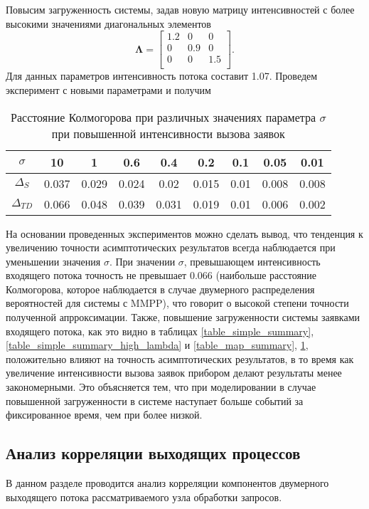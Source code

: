 Повысим загруженность системы, задав новую матрицу интенсивностей с более высокими значениями диагональных элементов 
 \begin{equation*}
	\boldsymbol{\Lambda}=\begin{bmatrix}
		1.2 &	0 & 0\\
		0 &	0.9 & 0\\
		0 &	0 & 1.5\\
	\end{bmatrix}.
\end{equation*}
Для данных параметров интенсивность потока составит 1.07. Проведем эксперимент с новыми параметрами и получим
\clearpage
\begin{table}[htb!] 
	\centering
	\caption{Расстояние Колмогорова при различных значениях параметра $\sigma$ при повышенной интенсивности вызова заявок}
	\label{table_map_summary_high_lambda}
	\begin{tabular}{| c | c | c | c | c | c | c | c | c |}
		\hline
		$\sigma$ & 10 & 1 & 0.6 & 0.4 & 0.2 & 0.1 & 0.05 & 0.01 \\ 
		\hline
		$\Delta_S$ & 0.037 & 0.029 & 0.024 & 0.02 & 0.015 & 0.01 & 0.008 & 0.008\\
		\hline
		$\Delta_{TD}$ & 0.066 & 0.048 & 0.039 & 0.031 & 0.019 & 0.01 & 0.006 & 0.002\\
		\hline
	\end{tabular}
\end{table}

На основании проведенных экспериментов можно сделать вывод, что тенденция к увеличению точности асимптотических результатов всегда наблюдается при уменьшении значения $\sigma$. При  значении $\sigma$, превышающем интенсивность входящего потока точность не превышает 0.066 (наибольше расстояние Колмогорова, которое наблюдается в случае двумерного распределения вероятностей для системы с MMPP), что говорит о высокой степени точности полученной апрроксимации. Также, повышение загруженности системы заявками входящего потока, как это видно в таблицах \ref{table_simple_summary}, \ref{table_simple_summary_high_lambda} и \ref{table_map_summary}, \ref{table_map_summary_high_lambda}, положительно влияют на точность асимптотических результатов, в то время как увеличение интенсивности вызова заявок прибором делают результаты менее закономерными. Это объясняется тем, что при моделировании в случае повышенной загруженности в системе наступает больше событий за фиксированное время, чем при более низкой.

\subsection{Анализ корреляции выходящих процессов}
В данном разделе проводится анализ корреляции компонентов двумерного выходящего потока рассматриваемого узла обработки запросов.

